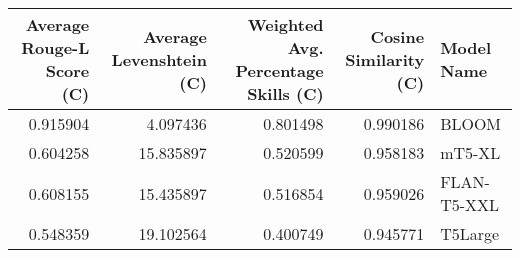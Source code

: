 \begin{tabular}{rrrrl}
\toprule
Average Rouge-L Score (C) & Average Levenshtein (C) & Weighted Avg. Percentage Skills (C) & Cosine Similarity (C) & Model Name \\
\midrule
0.915904 & 4.097436 & 0.801498 & 0.990186 & BLOOM \\
0.604258 & 15.835897 & 0.520599 & 0.958183 & mT5-XL \\
0.608155 & 15.435897 & 0.516854 & 0.959026 & FLAN-T5-XXL \\
0.548359 & 19.102564 & 0.400749 & 0.945771 & T5Large \\
\bottomrule
\end{tabular}
